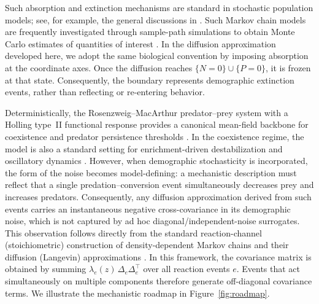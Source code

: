 \documentclass[pdflatex,sn-mathphys-ay]{sn-jnl}
\theoremstyle{thmstyleone}
\theoremstyle{definition}
\theoremstyle{remark}
\begin{document}
Such absorption and extinction mechanisms are standard in stochastic population models; see, for example, the general discussions in \citep{allen_stochastic_2015,ovaskainen_stochastic_2010,nasell_extinction_2001,lande_stochastic_2003}.
Such Markov chain models are frequently investigated through sample-path simulations to obtain Monte Carlo estimates of quantities of interest \citep{gibson_efficient_2000,gillespie_general_1976,korner-nievergelt_markov_2015,hobolth_simulation_2009}.
In the diffusion approximation developed here, we adopt the same biological convention by imposing absorption at the coordinate axes. Once the diffusion reaches $\{N=0\}\cup \{P=0\}$, it is frozen at that state. Consequently, the boundary represents demographic extinction events, rather than reflecting or re-entering behavior.



Deterministically, the Rosenzweig--MacArthur predator--prey system with a Holling type~II functional response
provides a canonical mean-field backbone for coexistence and predator persistence thresholds
\citep{rosenzweig_graphical_1963,holling_characteristics_1959,murray_mathematical_2002}.
In the coexistence regime, the model is also a standard setting for enrichment-driven destabilization
and oscillatory dynamics \citep{rosenzweig_paradox_1971,sugie_uniqueness_2012}.
However, when demographic stochasticity is incorporated, the form of the noise becomes model-defining:
a mechanistic description must reflect that a single predation--conversion event simultaneously decreases prey
and increases predators. Consequently, any diffusion approximation derived from such events carries an
instantaneous negative cross-covariance in its demographic noise, which is not captured by ad hoc
diagonal/independent-noise surrogates.
This observation follows directly from the standard reaction-channel (stoichiometric) construction of density-dependent Markov chains and their diffusion (Langevin) approximations
\citep{kurtz_solutions_1970,kurtz_limit_1971,kurtz_limit_1976,ethier_markov_1986,gillespie_exact_1977,gillespie_chemical_2000,anderson_continuous_2011,kampen_stochastic_2007}.
In this framework, the covariance matrix is obtained by summing $\lambda_e(z)\,\Delta_e\Delta_e^\top$ over all reaction events $e$. 
Events that act simultaneously on multiple components therefore generate off-diagonal covariance terms. We illustrate the mechanistic roadmap in Figure~\ref{fig:roadmap}.
\end{document}
